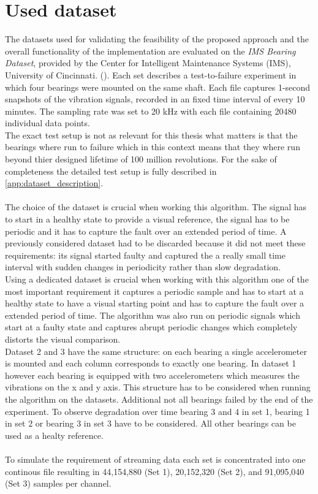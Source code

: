 \section{Used dataset}
The datasets used for validating the feasibility of the proposed approach and the overall functionality of the implementation are evaluated on the \textit{IMS Bearing Dataset}, provided by the Center for Intelligent Maintenance Systems (IMS), University of Cincinnati. (\cite{DATASET}).
Each set describes a test-to-failure experiment in which four bearings were mounted on the same shaft. Each file captures 1-second snapshots of the vibration signals, recorded in an fixed time interval of every 10 minutes. The sampling rate was set to 20 kHz with each file containing 20480 individual data points. \\
The exact test setup is not as relevant for this thesis what matters is that the bearings where run to failure which in this context means that they where run beyond thier designed lifetime of 100 million revolutions. For the sake of completeness the detailed test setup is fully described in \ref{app:dataset_description}.\\ \\

The choice of the dataset is crucial when working this algorithm. The signal has to start in a healthy state to provide a visual reference, the signal has to be periodic and it has to capture the fault over an extended period of time. A previously considered dataset had to be discarded because it did not meet these requirements: its signal started faulty and captured the a really small time interval with sudden changes in periodicity rather than slow degradation. \\
Using a dedicated dataset is crucial when working with this algorithm one of the most important requirement it captures a periodic sample and has to start at a healthy state to have a visual starting point and has to capture the fault over a extended period of time. The algorithm was also run on periodic signals which start at a faulty state and captures abrupt periodic changes which completely distorts the visual comparison. \\

Dataset 2 and 3 have the same structure: on each bearing a single accelerometer is mounted and each column corresponds to exactly one bearing. In dataset 1 however each bearing is equipped with 
two accelerometers which measures the vibrations on the x and y axis. This structure has to be considered when running the algorithm on the datasets. Additional not all bearings failed by the end of the experiment. To observe degradation over time bearing 3 and 4 in set 1, bearing 1 in set 2 or bearing 3 in set 3 have to be considered. All other bearings can be used as a healty reference. \\ \\

To simulate the requirement of streaming data each set is concentrated into one continous file resulting in 44,154,880 (Set 1), 20,152,320 (Set 2), and 91,095,040 (Set 3) samples per channel.




